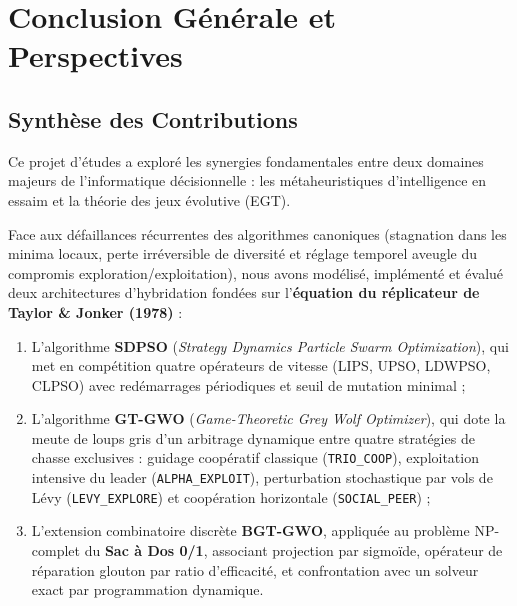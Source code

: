 \chapter{Conclusion Générale et Perspectives}
\label{chap:conclusion}

\section{Synthèse des Contributions}
Ce projet d'études a exploré les synergies fondamentales entre deux domaines majeurs de l'informatique décisionnelle : les métaheuristiques d'intelligence en essaim et la théorie des jeux évolutive (EGT). 

Face aux défaillances récurrentes des algorithmes canoniques (stagnation dans les minima locaux, perte irréversible de diversité et réglage temporel aveugle du compromis exploration/exploitation), nous avons modélisé, implémenté et évalué deux architectures d'hybridation fondées sur l'\textbf{équation du réplicateur de Taylor \& Jonker (1978)} :
\begin{enumerate}[label=\textbf{\arabic*.}]
    \item L'algorithme \textbf{SDPSO} (\textit{Strategy Dynamics Particle Swarm Optimization}), qui met en compétition quatre opérateurs de vitesse (LIPS, UPSO, LDWPSO, CLPSO) avec redémarrages périodiques et seuil de mutation minimal ;
    \item L'algorithme \textbf{GT-GWO} (\textit{Game-Theoretic Grey Wolf Optimizer}), qui dote la meute de loups gris d'un arbitrage dynamique entre quatre stratégies de chasse exclusives : guidage coopératif classique (\texttt{TRIO\_COOP}), exploitation intensive du leader (\texttt{ALPHA\_EXPLOIT}), perturbation stochastique par vols de Lévy (\texttt{LEVY\_EXPLORE}) et coopération horizontale (\texttt{SOCIAL\_PEER}) ;
    \item L'extension combinatoire discrète \textbf{BGT-GWO}, appliquée au problème NP-complet du \textbf{Sac à Dos 0/1}, associant projection par sigmoïde, opérateur de réparation glouton par ratio d'efficacité, et confrontation avec un solveur exact par programmation dynamique.
\end{enumerate}

